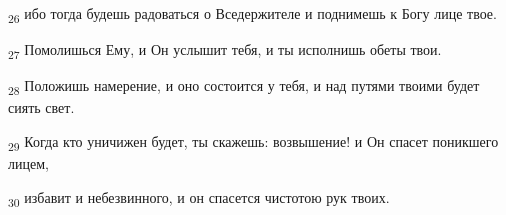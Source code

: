 \begin{tcolorbox}
\textsubscript{26} ибо тогда будешь радоваться о Вседержителе и поднимешь к Богу лице твое.
\end{tcolorbox}
\begin{tcolorbox}
\textsubscript{27} Помолишься Ему, и Он услышит тебя, и ты исполнишь обеты твои.
\end{tcolorbox}
\begin{tcolorbox}
\textsubscript{28} Положишь намерение, и оно состоится у тебя, и над путями твоими будет сиять свет.
\end{tcolorbox}
\begin{tcolorbox}
\textsubscript{29} Когда кто уничижен будет, ты скажешь: возвышение! и Он спасет поникшего лицем,
\end{tcolorbox}
\begin{tcolorbox}
\textsubscript{30} избавит и небезвинного, и он спасется чистотою рук твоих.
\end{tcolorbox}
